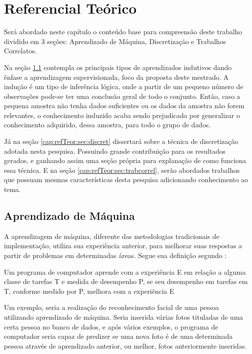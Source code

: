 \chapter{Referencial Teórico}\label{cap:refTeor}



Será abordado neste capítulo o conteúdo base para compreensão deste trabalho dividido em 3 seções: Aprendizado de Máquina, Discretização e Trabalhos Correlatos. 

Na seção \ref{cap:refTeor:sec:aprendMaq} contempla os principais tipos de aprendizados indutivos  dando ênfase a aprendizagem supervisionada, foco da proposta deste mestrado. A indução é um tipo de inferência lógica, onde a partir de um pequeno número de observações pode-se ter uma conclusão geral de todo o conjunto. Então, caso a pequena amostra não tenha dados suficientes ou os dados da amostra não forem relevantes, o conhecimento induzido acaba sendo prejudicado por generalizar o conhecimento adquirido, dessa amostra, para todo o grupo de dados.

Já na seção \ref{cap:refTeor:sec:discret} dissertará sobre a técnica de discretização adotada nesta pesquisa. Possuindo grande contribuição para os resultados gerados, e ganhando assim uma seção própria para explanação de como funciona essa técnica. E na seção \ref{cap:refTeor:sec:trabcorrel}, serão abordados trabalhos que possuam mesmas características desta pesquisa adicionando conhecimento ao tema.



\section{Aprendizado de Máquina}\label{cap:refTeor:sec:aprendMaq}

 A aprendizagem de máquina, diferente das metodologias tradicionais de implementação, utiliza sua experiência anterior, para melhorar suas respostas a partir de problemas em determinadas áreas. Segue sua definição segundo :
 
  \begin{teorema}
   Um programa de computador aprende com a experiência E em relação a alguma classe de tarefas T e medida de desempenho P, se seu desempenho em tarefas em T, conforme medido por P, melhora com a experiência E
   \label{teo:defaprendmaq}
  \end{teorema}
 
 Um exemplo, seria a realização do reconhecimento facial de uma pessoa utilizando aprendizado de máquina. Seria inserida várias fotos tituladas de uma certa pessoa no banco de dados, e após vários exemplos, o programa de computador seria capaz de predizer se uma nova foto é de uma determinada pessoa através de aprendizado  anterior, ou melhor, fotos anteriormente inseridas.

